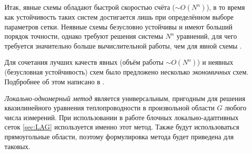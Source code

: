 \newcommand{\valpha}{v_{(\alpha)}}

Итак, явные схемы обладают быстрой скоростью счёта ($\sim O(N^n)$), в то время как устойчивость таких систем достигается лишь при определённом выборе параметров сетки.
Неявные схемы безусловно устойчивы и имеют больший порядок точности, однако требуют решения системы $N^n$ уравнений, для чего требуется значительно больше вычислительной работы, чем для явной схемы \cite{ТихоновСамарский}.

Для сочетания лучших качеств явных (объём работы $\sim O(N^n)$) и неявных (безусловная устойчивость) схем было предложено несколько \emph{экономичных} схем.
Подбробнее об этом написано в \cite{СамарскийТеорияРазностныхСхем, peaceman1955numerical, douglas1955numerical, яненко1959одном, дьяконов1962разностные, самарский1962одном}.

\emph{Локально-одномерный метод} является универсальным, пригодным для решения квазилинейного уравнения теплопроводности в произвольной области $G$ любого числа измерений.
При использовании в работе блочных локально-адаптивных сеток \ref{sec:LAG} используется именно этот метод.
Также будут использоваться прямоугольные области, поэтому формулировка метода будет приведена для таковых.

